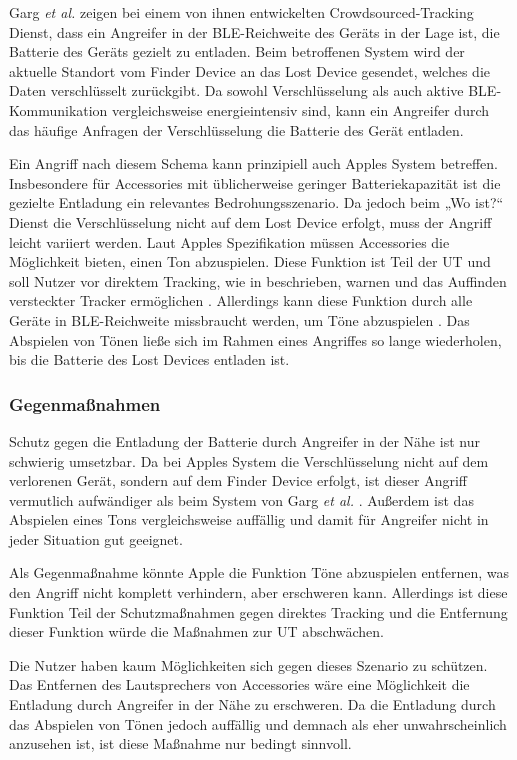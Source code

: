 Garg \textit{et al.} \cite{Garg_Secure_Tracker} zeigen bei einem von ihnen entwickelten Crowdsourced-Tracking Dienst, dass ein Angreifer in der \ac{BLE}-Reichweite des Geräts in der Lage ist, die Batterie des Geräts gezielt zu entladen.
Beim betroffenen System wird der aktuelle Standort vom Finder Device an das Lost Device gesendet, welches die Daten verschlüsselt zurückgibt.
Da sowohl Verschlüsselung als auch aktive \ac{BLE}-Kommunikation vergleichsweise energieintensiv sind, kann ein Angreifer durch das häufige Anfragen der Verschlüsselung die Batterie des Gerät entladen.

Ein Angriff nach diesem Schema kann prinzipiell auch Apples System betreffen.
Insbesondere für Accessories mit üblicherweise geringer Batteriekapazität ist die gezielte Entladung ein relevantes Bedrohungsszenario.
Da jedoch beim „Wo ist?“ Dienst die Verschlüsselung nicht auf dem Lost Device erfolgt, muss der Angriff leicht variiert werden.
Laut Apples Spezifikation müssen Accessories die Möglichkeit bieten, einen Ton abzuspielen.
Diese Funktion ist Teil der \ac{UT} und soll Nutzer vor direktem Tracking, wie in  beschrieben, warnen und das Auffinden versteckter Tracker ermöglichen \cite{Apple_FindMySpec}.
Allerdings kann diese Funktion durch alle Geräte in \ac{BLE}-Reichweite missbraucht werden, um Töne abzuspielen \cite{Heinrich_AirGuard}.
Das Abspielen von Tönen ließe sich im Rahmen eines Angriffes so lange wiederholen, bis die Batterie des Lost Devices entladen ist.

\subsubsection{Gegenmaßnahmen}
Schutz gegen die Entladung der Batterie durch Angreifer in der Nähe ist nur schwierig umsetzbar.
Da bei Apples System die Verschlüsselung nicht auf dem verlorenen Gerät, sondern auf dem Finder Device erfolgt, ist dieser Angriff vermutlich aufwändiger als beim System von Garg \textit{et al.} \cite{Garg_Secure_Tracker}.
Außerdem ist das Abspielen eines Tons vergleichsweise auffällig und damit für Angreifer nicht in jeder Situation gut geeignet.

Als Gegenmaßnahme könnte Apple die Funktion Töne abzuspielen entfernen, was den Angriff nicht komplett verhindern, aber erschweren kann.
Allerdings ist diese Funktion Teil der Schutzmaßnahmen gegen direktes Tracking und die Entfernung dieser Funktion würde die Maßnahmen zur \ac{UT} abschwächen.

Die Nutzer haben kaum Möglichkeiten sich gegen dieses Szenario zu schützen. 
Das Entfernen des Lautsprechers von Accessories wäre eine Möglichkeit die Entladung durch Angreifer in der Nähe zu erschweren.
Da die Entladung durch das Abspielen von Tönen jedoch auffällig und demnach als eher unwahrscheinlich anzusehen ist, ist diese Maßnahme nur bedingt sinnvoll.


